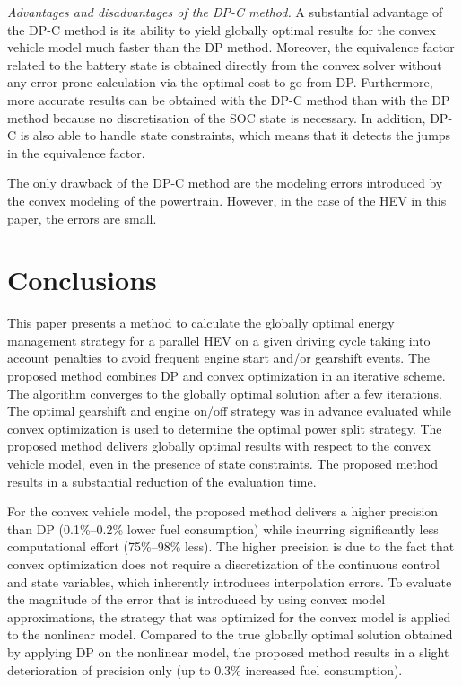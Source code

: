 \documentclass[conference]{IEEEtran}
\begin{document}
\noindent\emph{Advantages and disadvantages of the DP-C method.}
A substantial advantage of the DP-C method is its ability to yield globally optimal results for the convex vehicle model much faster than the DP method. Moreover, the equivalence factor related to the battery state is obtained directly from the convex solver without any error-prone calculation via the
optimal cost-to-go from DP. Furthermore, more accurate results can be obtained with the DP-C method than with the DP method because no discretisation of the SOC state is necessary. In addition, DP-C is also able to handle state constraints, which means that it detects the jumps in the equivalence factor.

The only drawback of the DP-C method are the modeling errors introduced by the convex modeling of the powertrain. However, in the case of the HEV in this paper, the errors are small.

\section{\textbf{Conclusions}}

This paper presents a method to calculate the globally optimal energy management strategy for a parallel HEV on a given driving cycle taking into account penalties to avoid frequent engine start and/or gearshift events. The proposed method combines DP and convex optimization in an iterative scheme.
The algorithm converges to the globally optimal solution after a few iterations. The optimal gearshift and engine on/off strategy was in advance evaluated while convex optimization is used to determine the optimal power split strategy. The proposed method delivers globally optimal results with respect to the convex vehicle model, even in the presence of state constraints. The proposed method results in a substantial reduction of the evaluation time.

For the convex vehicle model, the proposed method delivers a higher precision than DP (0.1\%–0.2\% lower fuel consumption) while incurring significantly less computational effort (75\%–98\% less). The higher precision is due to the fact that convex optimization does not require a discretization of the
continuous control and state variables, which inherently introduces interpolation errors. To evaluate the magnitude of the error that is introduced by using convex model approximations, the strategy that
was optimized for the convex model is applied to the nonlinear model. Compared to the true globally optimal solution obtained by applying DP on the nonlinear model, the proposed method results in a slight deterioration of precision only (up to 0.3\% increased fuel consumption).
\end{document}
